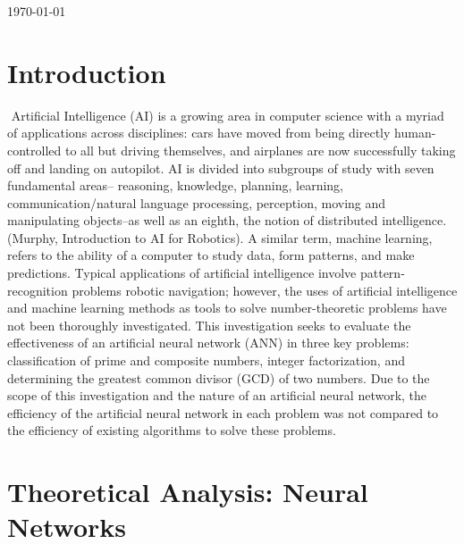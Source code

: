 \documentclass[11pt]{article}
\begin{document}
\begin{titlepage}
{\large \today}\\[3cm] 


 

\vfill 

\end{titlepage}

\tableofcontents
\newpage
\newpage

\section{Introduction}
$ $ \indent 
Artificial Intelligence (AI) is a growing area in computer science with a myriad of applications across disciplines: cars have moved from being directly human-controlled to all but driving themselves, and airplanes are now successfully taking off and landing on autopilot. AI is divided into subgroups of study with seven fundamental areas-- reasoning, knowledge, planning, learning, communication/natural language processing, perception, moving and manipulating objects--as well as an eighth, the notion of distributed intelligence. (Murphy, Introduction to AI for Robotics). A similar term, machine learning, refers to the ability of a computer to study data, form patterns, and make predictions. Typical applications of artificial intelligence involve pattern-recognition problems robotic navigation; however, the uses of artificial intelligence and machine learning methods as tools to solve number-theoretic problems have not been thoroughly investigated. This investigation seeks to evaluate the effectiveness of an artificial neural network (ANN) in three key problems: classification of prime and composite numbers, integer factorization, and determining the greatest common divisor (GCD) of two numbers. Due to the scope of this investigation and the nature of an artificial neural network, the efficiency of the artificial neural network in each problem was not compared to the efficiency of existing algorithms to solve these problems.



\section{Theoretical Analysis: Neural Networks}
\end{document}
